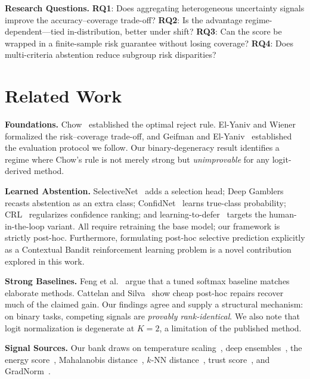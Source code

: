 \documentclass[conference]{IEEEtran}
\begin{document}
\textbf{Research Questions.}
\textbf{RQ1}: Does aggregating heterogeneous uncertainty signals improve the accuracy--coverage trade-off?
\textbf{RQ2}: Is the advantage regime-dependent---tied in-distribution, better under shift?
\textbf{RQ3}: Can the score be wrapped in a finite-sample risk guarantee without losing coverage?
\textbf{RQ4}: Does multi-criteria abstention reduce subgroup risk disparities?

\section{Related Work}
\label{sec:related}

\textbf{Foundations.} Chow~\cite{chow1970} established the optimal reject rule. El-Yaniv and Wiener~\cite{elyaniv2010foundations} formalized the risk--coverage trade-off, and Geifman and El-Yaniv~\cite{geifman2017selective} established the evaluation protocol we follow. Our binary-degeneracy result identifies a regime where Chow's rule is not merely strong but \emph{unimprovable} for any logit-derived method.

\textbf{Learned Abstention.} SelectiveNet~\cite{geifman2019selectivenet} adds a selection head; Deep Gamblers~\cite{liu2019deepgamblers} recasts abstention as an extra class; ConfidNet~\cite{corbiere2019confidnet} learns true-class probability; CRL~\cite{moon2020crl} regularizes confidence ranking; and learning-to-defer~\cite{mozannar2020defer} targets the human-in-the-loop variant. All require retraining the base model; our framework is strictly post-hoc. Furthermore, formulating post-hoc selective prediction explicitly as a Contextual Bandit reinforcement learning problem is a novel contribution explored in this work.

\textbf{Strong Baselines.} Feng et al.~\cite{feng2023better} argue that a tuned softmax baseline matches elaborate methods. Cattelan and Silva~\cite{cattelan2023logitnorm} show cheap post-hoc repairs recover much of the claimed gain. Our findings agree and supply a structural mechanism: on binary tasks, competing signals are \emph{provably rank-identical}. We also note that logit normalization is degenerate at $K{=}2$, a limitation of the published method.

\textbf{Signal Sources.} Our bank draws on temperature scaling~\cite{guo2017calibration}, deep ensembles~\cite{lakshminarayanan2017ensembles}, the energy score~\cite{liu2020energy}, Mahalanobis distance~\cite{lee2018mahalanobis}, $k$-NN distance~\cite{sun2022knn}, trust score~\cite{jiang2018trustscore}, and GradNorm~\cite{huang2021gradnorm}.
\end{document}
